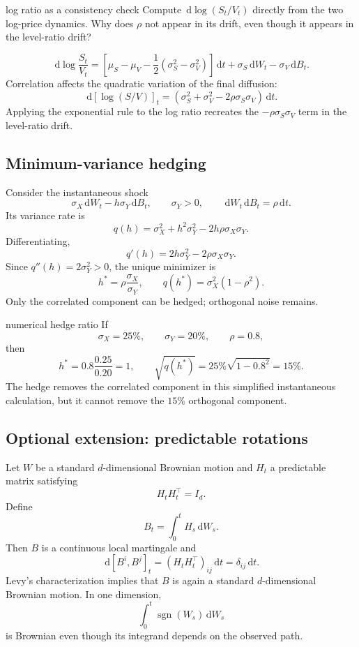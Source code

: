 \documentclass[10pt]{article}
\newcommand{\1}{\mathbf 1}
\newcommand{\dd}{\,\mathrm d}
\theoremstyle{definition}
\begin{document}
\begin{studentexercise}{log ratio as a consistency check}
Compute \(\dd\log(S_t/V_t)\) directly from the two log-price dynamics.
Why does \(\rho\) not appear in its drift, even though it appears in the
level-ratio drift?
\end{studentexercise}
\begin{shortsolution}
\[
\boxed{
\dd\log\frac{S_t}{V_t}
=\left[
\mu_S-\mu_V-\frac12(\sigma_S^2-\sigma_V^2)
\right]\dd t
+\sigma_S\dd W_t-\sigma_V\dd B_t.}
\]
Correlation affects the quadratic variation of the final diffusion:
\[
\dd\left[\log(S/V)\right]_t
=\left(\sigma_S^2+\sigma_V^2
-2\rho\sigma_S\sigma_V\right)\dd t.
\]
Applying the exponential rule to the log ratio recreates the
\(-\rho\sigma_S\sigma_V\) term in the level-ratio drift.
\end{shortsolution}

\subsection{Minimum-variance hedging}

Consider the instantaneous shock
\[
\sigma_X\dd W_t-h\sigma_Y\dd B_t,
\qquad \sigma_Y>0,
\qquad
\dd W_t\dd B_t=\rho\dd t.
\]
Its variance rate is
\[
q(h)=\sigma_X^2+h^2\sigma_Y^2
-2h\rho\sigma_X\sigma_Y.
\]
Differentiating,
\[
q'(h)=2h\sigma_Y^2-2\rho\sigma_X\sigma_Y.
\]
Since \(q''(h)=2\sigma_Y^2>0\), the unique minimizer is
\[
\boxed{
h^*=\rho\frac{\sigma_X}{\sigma_Y},
\qquad
q(h^*)=\sigma_X^2(1-\rho^2).}
\]
Only the correlated component can be hedged; orthogonal noise remains.

\begin{boardexample}{numerical hedge ratio}
If
\[
\sigma_X=25\%,\qquad \sigma_Y=20\%,\qquad \rho=0.8,
\]
then
\[
h^*=0.8\frac{0.25}{0.20}=1,
\qquad
\sqrt{q(h^*)}=25\%\sqrt{1-0.8^2}=15\%.
\]
The hedge removes the correlated component in this simplified instantaneous
calculation, but it cannot remove the \(15\%\) orthogonal component.
\end{boardexample}

\subsection{Optional extension: predictable rotations}

Let \(W\) be a standard \(d\)-dimensional Brownian motion and \(H_t\) a
predictable matrix satisfying
\[
H_tH_t^\top=I_d.
\]
Define
\[
B_t=\int_0^tH_s\dd W_s.
\]
Then \(B\) is a continuous local martingale and
\[
\dd[B^i,B^j]_t
=(H_tH_t^\top)_{ij}\dd t
=\delta_{ij}\dd t.
\]
Levy's characterization implies that \(B\) is again a standard
\(d\)-dimensional Brownian motion. In one dimension,
\[
\int_0^t\operatorname{sgn}(W_s)\dd W_s
\]
is Brownian even though its integrand depends on the observed path.
\end{document}
